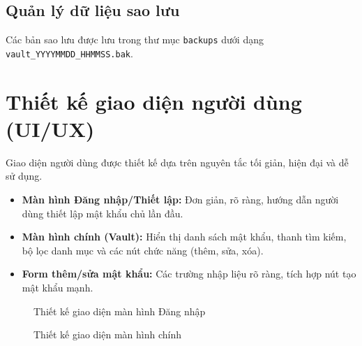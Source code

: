 \subsection{Quản lý dữ liệu sao lưu}
Các bản sao lưu được lưu trong thư mục \texttt{backups} dưới dạng \texttt{vault\_YYYYMMDD\_HHMMSS.bak}.

\section{Thiết kế giao diện người dùng (UI/UX)}
Giao diện người dùng được thiết kế dựa trên nguyên tắc tối giản, hiện đại và dễ sử dụng.
\begin{itemize}
    \item \textbf{Màn hình Đăng nhập/Thiết lập:} Đơn giản, rõ ràng, hướng dẫn người dùng thiết lập mật khẩu chủ lần đầu.
    \item \textbf{Màn hình chính (Vault):} Hiển thị danh sách mật khẩu, thanh tìm kiếm, bộ lọc danh mục và các nút chức năng (thêm, sửa, xóa).
    \item \textbf{Form thêm/sửa mật khẩu:} Các trường nhập liệu rõ ràng, tích hợp nút tạo mật khẩu mạnh.
\end{itemize}

\begin{figure}[H]
    \centering
    \caption{Thiết kế giao diện màn hình Đăng nhập}
    \label{fig:login_screen}
\end{figure}

\begin{figure}[H]
    \centering
    \caption{Thiết kế giao diện màn hình chính}
    \label{fig:main_screen}
\end{figure}
\newpage